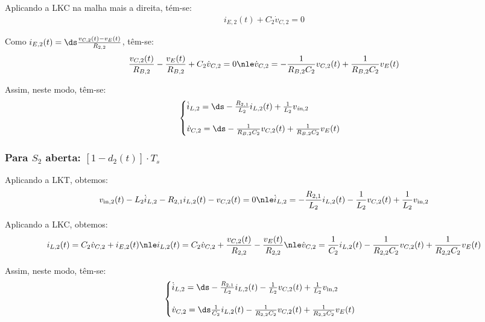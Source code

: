 Aplicando a LKC na malha mais a direita, tém-se:
\begin{gather}
  i_{E,2}(t) + C_2 \dot{v}_{C,2} = 0
\end{gather}

Como $i_{E,2}(t) = \ds \frac{v_{C,2}(t) - v_E(t)}{R_{2,2}}$, têm-se:
\begin{gather}
  \frac{v_{C,2}(t)}{R_{B,2}} - \frac{v_E(t)}{R_{B,2}} + C_2 \dot{v}_{C,2} = 0 \nle
  \dot{v}_{C,2} = - \frac{1}{R_{B,2} C_2} v_{C,2}(t) + \frac{1}{R_{B,2} C_2} v_{E}(t)
\end{gather}

Assim, neste modo, têm-se:
\begin{gather}
  \begin{cases}
    \dot i_{L,2} = \ds - \frac{R_{2,1}}{L_2} i_{L,2}(t) + \frac{1}{L_2} v_{\textit{in}, 2} \\[12pt]
    \dot{v}_{C,2} = \ds - \frac{1}{R_{B,2} C_2} v_{C,2}(t) + \frac{1}{R_{B,2} C_2} v_{E}(t)
  \end{cases}
\end{gather}

\vspace*{8pt}
\subsubsection*{Para $S_2$ aberta: $\left[1 - d_2(t)\right] \cdot T_s$}

Aplicando a LKT, obtemos:
\begin{gather}
  v_{\text{in}, 2}(t) - L_2 \dot i_{L,2} - R_{2,1} i_{L,2} (t) - v_{C,2} (t)= 0 \nle
  \dot i_{L,2} = - \frac{R_{2,1}}{L_2} i_{L,2}(t) - \frac{1}{L_2} v_{C,2}(t) + \frac{1}{L_2} v_{\text{in}, 2}
\end{gather}

Aplicando a LKC, obtemos:
\begin{gather}
  i_{L,2}(t) = C_2 \dot v_{C,2} + i_{E,2}(t) \nle
  i_{L,2}(t) = C_2 \dot v_{C,2} +  \frac{v_{C,2}(t)}{R_{2,2}} - \frac{v_E(t)}{R_{2,2}} \nle
  \dot{v}_{C,2} =  \frac{1}{C_2} i_{L,2}(t) - \frac{1}{R_{2,2}C_2} v_{C,2}(t) + \frac{1}{R_{2,2} C_2} v_E(t)
\end{gather}

Assim, neste modo, têm-se:
\begin{gather}
  \begin{cases}
    \dot i_{L,2} = \ds - \frac{R_{2,1}}{L_2} i_{L,2}(t) - \frac{1}{L_2} v_{C,2}(t) + \frac{1}{L_2} v_{\text{in}, 2} \\[12pt]
    \dot{v}_{C,2} = \ds \frac{1}{C_2} i_{L,2}(t) - \frac{1}{R_{2,2}C_2} v_{C,2}(t) + \frac{1}{R_{2,2} C_2} v_E(t)
  \end{cases}
\end{gather}

